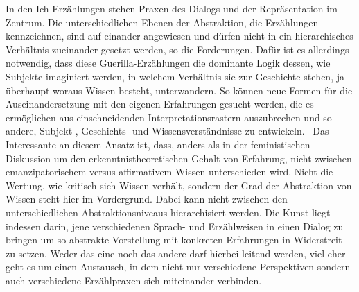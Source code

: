 In den Ich-Erzählungen stehen Praxen des Dialogs und der Repräsentation im
Zentrum. Die unterschiedlichen Ebenen der Abstraktion, die Erzählungen
kennzeichnen, sind auf einander angewiesen und dürfen nicht in ein
hierarchisches Verhältnis zueinander gesetzt werden, so die Forderungen. Dafür
ist es allerdings notwendig, dass diese Guerilla-Erzählungen die dominante Logik
dessen, wie Subjekte imaginiert werden, in welchem Verhältnis sie zur Geschichte
stehen, ja überhaupt woraus Wissen besteht, unterwandern. So können neue Formen
für die Auseinandersetzung mit den eigenen Erfahrungen gesucht werden, die es
ermöglichen aus einschneidenden Interpretationsrastern auszubrechen und so
andere, Subjekt-, Geschichts- und Wissensverständnisse zu entwickeln. \
Das
Interessante an diesem Ansatz ist, dass, anders als in der feministischen
Diskussion um den erkenntnistheoretischen Gehalt von Erfahrung, nicht zwischen
emanzipatorischem versus affirmativem Wissen unterschieden wird. Nicht die
Wertung, wie kritisch sich Wissen verhält, sondern der Grad der Abstraktion von
Wissen steht hier im Vordergrund. Dabei kann nicht zwischen den
unterschiedlichen Abstraktionsniveaus hierarchisiert werden. Die Kunst liegt
indessen darin, jene verschiedenen Sprach- und Erzählweisen in einen Dialog zu
bringen um so abstrakte Vorstellung mit konkreten Erfahrungen in Widerstreit zu
setzen. Weder das eine noch das andere darf hierbei leitend werden, viel eher
geht es um einen Austausch, in dem nicht nur verschiedene Perspektiven sondern
auch verschiedene Erzählpraxen sich miteinander verbinden.
\\

